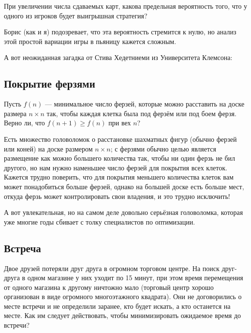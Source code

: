 При увеличении числа сдаваемых карт,
какова предельная вероятность того, что у одного из игроков будет выигрышная стратегия?

\medskip

Борис (как и я) подозревает, что эта вероятность стремится к нулю, но анализ этой простой вариации игры в пьяницу кажется сложным.

\medskip

А вот неожиданная загадка от Стива Хедетниеми из Университета Клемсона:

\subsection*{Покрытие ферзями}

Пусть $f(n)$ --- минимальное число ферзей, которые можно расставить на доске размера $n \times n$ так, чтобы каждая клетка была под ферзём или под боем ферзя.
Верно ли, что $f(n + 1) \geqslant f(n)$ при вех $n$?

\medskip

Есть множество головоломок о расстановке шахматных фигур (обычно ферзей или коней) на доске размером $n \times n$; с ферзями обычно целью является размещение как можно большего количества так, чтобы ни один ферзь не бил другого, но нам нужно наменьшее число ферзей для покрытия всех клеток.
Кажется трудно поверить, что для покрытия меньшего количества клеток вам может понадобиться больше ферзей, однако на большей доске есть больше мест, откуда ферзь может контролировать свои владения, и это трудно исключить!

\medskip

А вот увлекательная, но на самом деле довольно серьёзная головоломка, которая уже многие годы сбивает с толку специалистов по оптимизации.

\subsection*{Встреча}

Двое друзей потеряли друг друга в огромном торговом центре.
На поиск друг-друга в одном магазине у них уходит по 15 минут,
при этом время перемещения от одного магазина к другому ничтожно мало
(торговый центр хорошо организован в виде огромного многоэтажного квадрата).
Они не договорились о месте встречи и не определили заранее, кто будет искать, а кто останется на месте.
Как им следует действовать, чтобы минимизировать ожидаемое время до встречи?

\medskip

